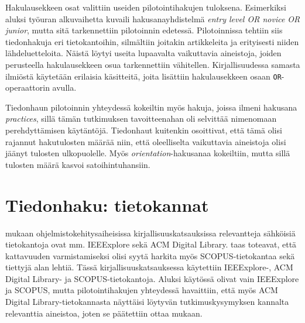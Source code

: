 \documentclass[utf8]{gradu3}
\begin{document}
Hakulausekkeen osat valittiin useiden pilotointihakujen tuloksena. Esimerkiksi aluksi työuran alkuvaihetta kuvaili hakusanayhdistelmä \textit{entry level OR novice OR junior}, mutta sitä tarkennettiin pilotoinnin edetessä. Pilotoinnissa tehtiin siis tiedonhakuja eri tietokantoihin, silmältiin joitakin artikkeleita ja erityisesti niiden lähdeluetteloita. Näistä löytyi useita lupaavalta vaikuttavia aineistoja, joiden perusteella hakulausekkeen osua tarkennettiin vähitellen. Kirjallisuudessa samasta ilmiöstä käytetään erilaisia käsitteitä, joita lisättiin hakulausekkeen osaan {\tt OR}-operaattorin avulla.

Tiedonhaun pilotoinnin yhteydessä kokeiltin myös hakuja, joissa ilmeni hakusana \textit{practices}, sillä tämän tutkimuksen tavoitteenahan oli selvittää nimenomaan perehdyttämisen käytäntöjä. Tiedonhaut kuitenkin osoittivat, että tämä olisi rajannut hakutulosten määrää niin, että oleelliselta vaikuttavia aineistoja olisi jäänyt tulosten ulkopuolelle. Myös \textit{orientation}-hakusanaa kokeiltiin, mutta sillä tulosten määrä kasvoi satoihintuhansiin. 



\section{Tiedonhaku: tietokannat}

\textcite{brereton-ym-2007} mukaan ohjelmistokehitysaiheisissa kirjallisuuskatsauksissa relevantteja sähköisiä tietokantoja ovat mm. IEEExplore sekä ACM Digital Library. \textcite{kitchenham-charters-2007} taas toteavat, että kattavuuden varmistamiseksi olisi syytä harkita myös SCOPUS-tietokantaa sekä tiettyjä alan lehtiä. 
Tässä kirjallisuuskatsauksessa käytettiin IEEExplore-, ACM Digital Library- ja SCOPUS-tietokantoja. Aluksi käytössä olivat vain IEEExplore ja SCOPUS, mutta pilotointihakujen yhteydessä havaittiin, että myös ACM Digital Library-tietokannasta näyttäisi löytyvän tutkimuskysymyksen kannalta relevanttia aineistoa, joten se päätettiin ottaa mukaan.
\end{document}
